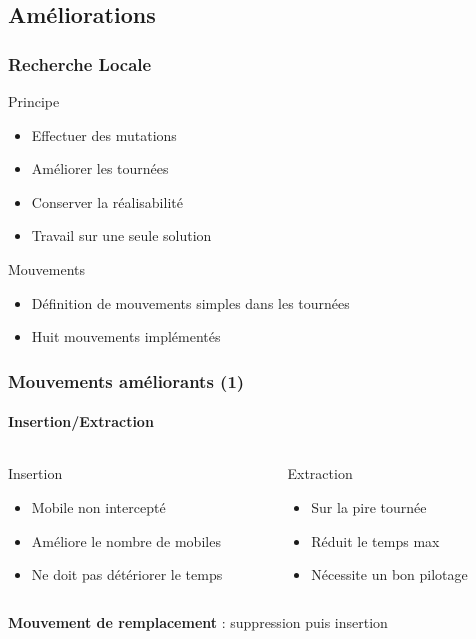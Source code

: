 \subsection{Améliorations}
\begin{frame}
	\frametitle{Recherche Locale}
	\begin{block}{Principe}
		\begin{itemize}
			\item Effectuer des mutations
			\item Améliorer les tournées
			\item Conserver la réalisabilité
			\item Travail sur une seule solution
		\end{itemize}
	\end{block}
	\vspace*{1em}
	\begin{block}{Mouvements}
		\begin{itemize}
			\item Définition de mouvements simples dans les tournées
			\item Huit mouvements implémentés
		\end{itemize}
	\end{block}
	
\end{frame}
\begin{frame}
	\frametitle{Mouvements améliorants (1)}
	\framesubtitle{Insertion/Extraction}
	\begin{columns}
		\begin{column}{.53\linewidth}
			\begin{block}{Insertion}
				\centering
				\begin{tikzpicture}[scale=.7,schema,transform shape,thick]
					
				\end{tikzpicture}
			\end{block}
			\begin{itemize}
				\item Mobile non intercepté
				\item Améliore le nombre de mobiles
				\item Ne doit pas détériorer le temps
			\end{itemize}
		\end{column}
		\begin{column}{.53\linewidth}
			\begin{block}{Extraction}
				\centering
				\begin{tikzpicture}[scale=.7,schema,transform shape,thick]
					
				\end{tikzpicture}
			\end{block}
			\begin{itemize}
				\item Sur la pire tournée
				\item Réduit le temps max
				\item Nécessite un bon pilotage
			\end{itemize}
		\end{column}
	\end{columns}
	\vspace*{2em}
	\textbf{Mouvement de remplacement} : suppression puis insertion
\end{frame}
